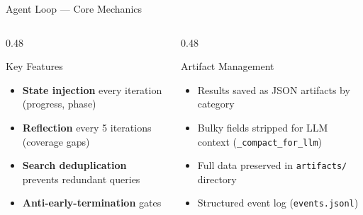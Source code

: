 \documentclass[aspectratio=169, 11pt]{beamer}
\begin{document}
\begin{frame}{Agent Loop --- Core Mechanics}
\begin{center}
\begin{tikzpicture}
\end{tikzpicture}
\end{center}

\vspace{4pt}
\begin{columns}[T]
\begin{column}{0.48\textwidth}
\begin{block}{\small Key Features}
\begin{itemize}\scriptsize
\item \textbf{State injection} every iteration (progress, phase)
\item \textbf{Reflection} every 5 iterations (coverage gaps)
\item \textbf{Search deduplication} prevents redundant queries
\item \textbf{Anti-early-termination} gates
\end{itemize}
\end{block}
\end{column}
\begin{column}{0.48\textwidth}
\begin{block}{\small Artifact Management}
\begin{itemize}\scriptsize
\item Results saved as JSON artifacts by category
\item Bulky fields stripped for LLM context (\texttt{\_compact\_for\_llm})
\item Full data preserved in \texttt{artifacts/} directory
\item Structured event log (\texttt{events.jsonl})
\end{itemize}
\end{block}
\end{column}
\end{columns}
\end{frame}
\end{document}
